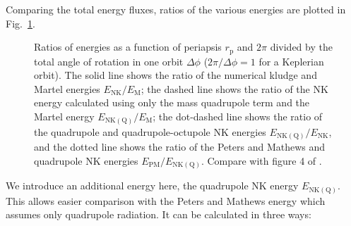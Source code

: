 \documentclass[useAMS,usedcolumn,usegraphicx,usenatbib]{mn2e}
\newcommand{\figref}[1]{Fig.~\ref{fig:#1}}
\newcommand{\sub}[1]{\ensuremath{_\mathrm{#1}}}
\begin{document}
Comparing the total energy fluxes, ratios of the various energies are plotted in \figref{Energy_ratio}.
\begin{figure}
  \begin{center}
    \quad
    \caption{Ratios of energies as a function of periapsis $r\sub{p}$ and $2\pi$ divided by the total angle of rotation in one orbit $\Delta\phi$ ($2\pi/\Delta\phi = 1$ for a Keplerian orbit). The solid line shows the ratio of the numerical kludge and Martel energies $E\sub{NK}/E\sub{M}$; the dashed line shows the ratio of the NK energy calculated using only the mass quadrupole term and the Martel energy $E\sub{NK(Q)}/E\sub{M}$; the dot-dashed line shows the ratio of the quadrupole and quadrupole-octupole NK energies $E\sub{NK(Q)}/E\sub{NK}$, and the dotted line shows the ratio of the Peters and Mathews and quadrupole NK energies $E\sub{PM}/E\sub{NK(Q)}$. Compare with figure 4 of \citet{Gair2005}.}
    \label{fig:Energy_ratio}
  \end{center}
\end{figure}
We introduce an additional energy here, the quadrupole NK energy $E\sub{NK(Q)}$. This allows easier comparison with the Peters and Mathews energy which assumes only quadrupole radiation. It can be calculated in three ways:
\end{document}
